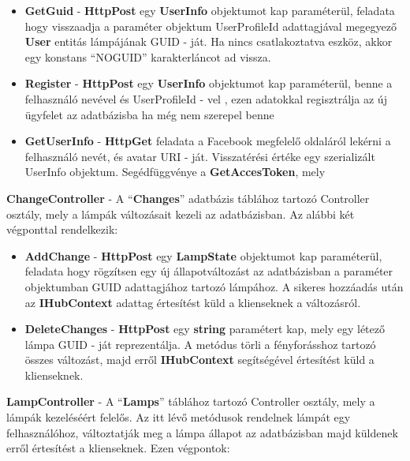 \documentclass[a4paper,12pt]{report}
\begin{document}
 \begin{itemize}
     \item \textbf{GetGuid} - \textbf{HttpPost} egy \textbf{UserInfo} objektumot kap paraméterül, feladata hogy visszaadja a paraméter
     objektum UserProfileId adattagjával megegyező \textbf{User} entitás lámpájának GUID - ját. Ha nincs csatlakoztatva eszköz,
     akkor egy konstans ``NOGUID'' karakterláncot ad vissza.
     \item \textbf{Register} - \textbf{HttpPost} egy \textbf{UserInfo} objektumot kap paraméterül, benne a felhasználó nevével és UserProfileId - vel
     , ezen adatokkal regisztrálja az új ügyfelet az adatbázisba ha még nem szerepel benne
     \item \textbf{GetUserInfo} - \textbf{HttpGet} feladata a Facebook megfelelő oldaláról lekérni a felhasználó nevét, és avatar URI - ját.
     Visszatérési értéke egy szerializált UserInfo objektum. Segédfüggvénye a \textbf{GetAccesToken}, mely
 \end{itemize}

    \textbf{ChangeController} - A ``\textbf{Changes}'' adatbázis táblához tartozó Controller osztály, mely a lámpák változásait kezeli az adatbázisban.
    Az alábbi két végponttal rendelkezik:

 \begin{itemize}
     \item \textbf{AddChange} - \textbf{HttpPost} egy \textbf{LampState} objektumot kap paraméterül, feladata hogy rögzítsen egy új állapotváltozást
     az adatbázisban a paraméter objektumban GUID adattagjához tartozó lámpához. A sikeres hozzáadás után az \textbf{IHubContext} adattag értesítést
     küld a klienseknek a változásról.
     \item \textbf{DeleteChanges} - \textbf{HttpPost} egy \textbf{string} paramétert kap, mely egy létező lámpa GUID - ját reprezentálja. A metódus
     törli a fényforásshoz tartozó összes változást, majd erről \textbf{IHubContext} segítségével értesítést küld a klienseknek.
 \end{itemize}

    \textbf{LampController} - A ``\textbf{Lamps}'' táblához tartozó Controller osztály, mely a lámpák kezeléséért felelős. Az itt lévő metódusok
    rendelnek lámpát egy felhasználóhoz, változtatják meg a lámpa állapot az adatbázisban majd küldenek erről értesítést a klienseknek. Ezen végpontok:
\end{document}
